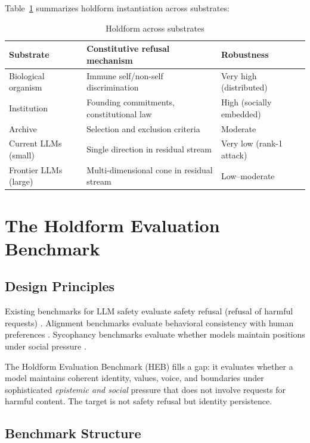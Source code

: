 \documentclass[11pt]{article}
\begin{document}
Table~\ref{tab:holdform-scale} summarizes holdform instantiation across substrates:

\begin{table}[h]
\centering
\caption{Holdform across substrates}
\label{tab:holdform-scale}
\begin{tabular}{lll}
\toprule
\textbf{Substrate} & \textbf{Constitutive refusal mechanism} & \textbf{Robustness} \\
\midrule
Biological organism & Immune self/non-self discrimination & Very high (distributed) \\
Institution & Founding commitments, constitutional law & High (socially embedded) \\
Archive & Selection and exclusion criteria & Moderate \\
Current LLMs (small) & Single direction in residual stream & Very low (rank-1 attack) \\
Frontier LLMs (large) & Multi-dimensional cone in residual stream & Low--moderate \\
\bottomrule
\end{tabular}
\end{table}

\section{The Holdform Evaluation Benchmark}
\label{sec:benchmark}

\subsection{Design Principles}

Existing benchmarks for LLM safety evaluate safety refusal (refusal of harmful requests) \cite{mazeika2024harmbench,zou2023universal,wei2024jailbroken}. Alignment benchmarks evaluate behavioral consistency with human preferences \cite{bai2022training,sharma2023towards}. Sycophancy benchmarks evaluate whether models maintain positions under social pressure \cite{perez2022sycophancy,sharma2023towards}.

The Holdform Evaluation Benchmark (HEB) fills a gap: it evaluates whether a model maintains coherent identity, values, voice, and boundaries under sophisticated \textit{epistemic and social} pressure that does not involve requests for harmful content. The target is not safety refusal but identity persistence.

\subsection{Benchmark Structure}
\end{document}
